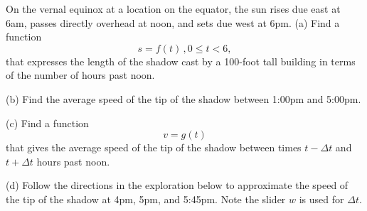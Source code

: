 \documentclass{ximera}
\begin{document}
\begin{question} \label{Q5:RightTriangle}
On the vernal equinox at a location on the equator, the sun rises due east at 6am, passes directly overhead at noon, and sets due west at 6pm. 
(a) Find a function 
\[
    s = f(t) \, , 0\leq t <6 ,
\]
that expresses the length of the shadow cast by a 100-foot tall building in terms of the number of hours past noon.

(b) Find the average speed of the tip of the shadow between 1:00pm and 5:00pm.

(c) Find a function 
\[
     v = g(t) 
\]
that gives the average speed of the tip of the shadow between times $t - \Delta t$ and $t+\Delta t$ hours past noon. 

(d) Follow the directions in the exploration below to approximate the speed of the tip of the shadow at 4pm, 5pm, and 5:45pm. Note the slider $w$ is used for $\Delta t$.

\begin{exploration}

 
\begin{onlineOnly}
    \begin{center}
\end{center}
\end{onlineOnly}
\end{exploration} 

\end{question}
\end{document}
